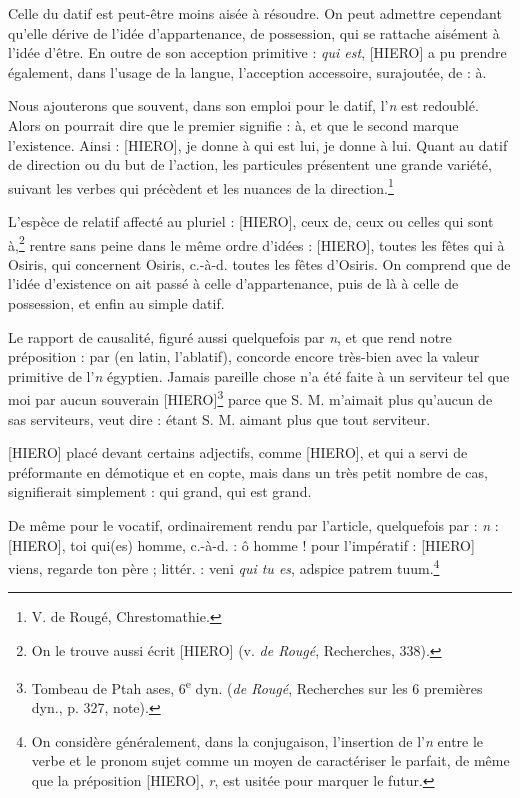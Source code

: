 \documentclass[a4paper, 11pt, oneside]{article}
\begin{document}
Celle du datif est peut-être moins aisée à résoudre. On peut admettre cependant qu'elle dérive de l'idée d'appartenance, de possession, qui se rattache aisément à l'idée d'être. En outre de son acception primitive : \emph{qui est}, [HIERO] a pu prendre également, dans l'usage de la langue, l'acception accessoire, surajoutée, de : à.

Nous ajouterons que souvent, dans son emploi pour le datif, l'\emph{n} est redoublé. Alors on pourrait dire que le premier signifie : à, et que le second marque l'existence. Ainsi : [HIERO], je donne à qui est lui, je donne à lui. Quant au datif de direction ou du but de l'action, les particules présentent une grande variété, suivant les verbes qui précèdent et les nuances de la direction.\footnote{V. de Rougé, Chrestomathie.}

L'espèce de relatif affecté au pluriel : [HIERO], ceux de, ceux ou celles qui sont à,\footnote{On le trouve aussi écrit [HIERO] (v. \emph{de Rougé}, Recherches, 338).} rentre sans peine dans le même ordre d'idées : [HIERO], toutes les fêtes qui à Osiris, qui concernent Osiris, c.-à-d. toutes les fêtes d'Osiris. On comprend que de l'idée d'existence on ait passé à celle d'appartenance, puis de là à celle de possession, et enfin au simple datif.

Le rapport de causalité, figuré aussi quelquefois par \emph{n}, et que rend notre préposition : par (en latin, l'ablatif), concorde encore très-bien avec la valeur primitive de l'\emph{n} égyptien. Jamais pareille chose n'a été faite à un serviteur tel que moi par aucun souverain [HIERO]\footnote{Tombeau de Ptah ases, 6\textsuperscript{e} dyn. (\emph{de Rougé}, Recherches sur les 6 premières dyn., p. 327, note).} parce que S. M. m'aimait plus qu'aucun de sas serviteurs, veut dire : étant S. M. aimant plus que tout serviteur.

[HIERO] placé devant certains adjectifs, comme [HIERO], et qui a servi de préformante en démotique et en copte, mais dans un très petit nombre de cas, signifierait simplement : qui grand, qui est grand.

De même pour le vocatif, ordinairement rendu par l'article, quelquefois par : \emph{n} : [HIERO], toi qui(es) homme, c.-à-d. : ô homme ! pour l'impératif : [HIERO] viens, regarde ton père ; littér. : veni \emph{qui tu es}, adspice patrem tuum.\footnote{On considère généralement, dans la conjugaison, l'insertion de l'\emph{n} entre le verbe et le pronom sujet comme un moyen de caractériser le parfait, de même que la préposition [HIERO], \emph{r}, est usitée pour marquer le futur.}
\end{document}
